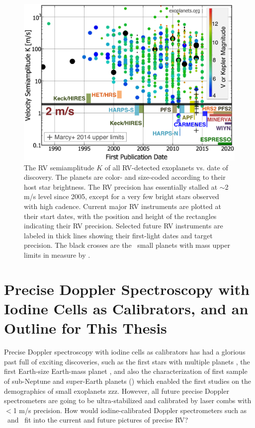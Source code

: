 \begin{figure}
\centering
\includegraphics[scale=0.32]{introduction/family-big-carmenes.eps}
\caption{The RV semiamplitude $K$ of all RV-detected exoplanets
  vs. date of discovery. The planets are color- and size-coded according
  to their host star brightness. The RV precision has essentially
  stalled at $\sim$2 m/s level since 2005, except for a very few bright
  stars observed with high cadence. Current major RV instruments are
  plotted at their start dates, with the position and height of the
  rectangles indicating their RV precision. Selected future RV
  instruments are labeled in thick lines showing their first-light dates
  and target precision. The black crosses are the \kepler\ small planets
  with mass upper limits in \cite{marcy2014} measure by \keck.
\label{intro:fig:family}}
\end{figure}



\section{Precise Doppler Spectroscopy with Iodine Cells as
  Calibrators, and an Outline for This Thesis} 

Precise Doppler spectroscopy with iodine cells as calibrators has had
a glorious past full of exciting discoveries, such as the first stars
with multiple planets \citep{butler1999}, the first Earth-size
Earth-mass planet \cite{howard2013, pepe2013}, and also the
characterization of first sample of sub-Neptune and super-Earth
planets (\citealt{marcy2014}) which enabled the first studies on the
demographics of small exoplanets zzz. However, all future precise
Doppler spectrometers are going to be ultra-stabilized and calibrated
by laser combs with $<$1 m/s precision. How would
iodine-calibrated Doppler spectrometers such as \het\ and \keck\ fit
into the current and future pictures of precise RV?

